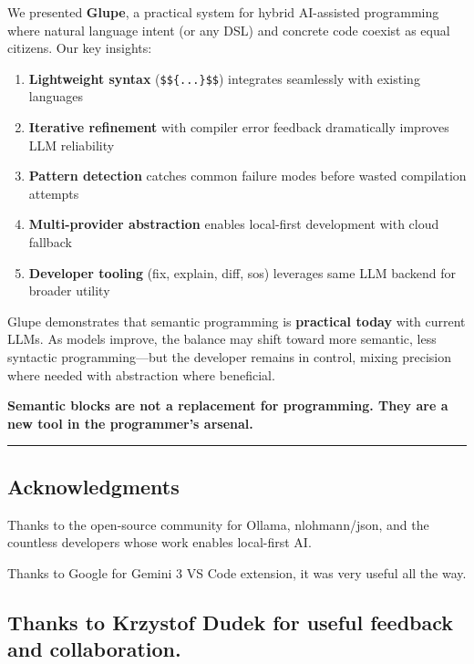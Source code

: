 \documentclass[11pt, a4paper]{article}
\providecommand{\tightlist}{\setlength{\itemsep}{0pt}\setlength{\parskip}{0pt}}
\begin{document}
We presented \textbf{Glupe}, a practical system for hybrid AI-assisted
programming where natural language intent (or any DSL) and concrete code
coexist as equal citizens. Our key insights:

\begin{enumerate}
\def\labelenumi{\arabic{enumi}.}
\tightlist
\item
  \textbf{Lightweight syntax} (\texttt{\$\$\{...\}\$\$}) integrates
  seamlessly with existing languages
\item
  \textbf{Iterative refinement} with compiler error feedback
  dramatically improves LLM reliability
\item
  \textbf{Pattern detection} catches common failure modes before wasted
  compilation attempts
\item
  \textbf{Multi-provider abstraction} enables local-first development
  with cloud fallback
\item
  \textbf{Developer tooling} (fix, explain, diff, sos) leverages same
  LLM backend for broader utility
\end{enumerate}

Glupe demonstrates that semantic programming is \textbf{practical today}
with current LLMs. As models improve, the balance may shift toward more
semantic, less syntactic programming---but the developer remains in
control, mixing precision where needed with abstraction where
beneficial.

\textbf{Semantic blocks are not a replacement for programming. They are
a new tool in the programmer's arsenal.}

\begin{center}\rule{0.5\linewidth}{0.5pt}\end{center}

\subsection{Acknowledgments}\label{acknowledgments}

Thanks to the open-source community for Ollama, nlohmann/json, and the
countless developers whose work enables local-first AI.

Thanks to Google for Gemini 3 VS Code extension, it was very useful all
the way.

\subsection{Thanks to Krzystof Dudek for useful feedback and
collaboration.}\label{thanks-to-krzystof-dudek-for-useful-feedback-and-collaboration.}
\end{document}
